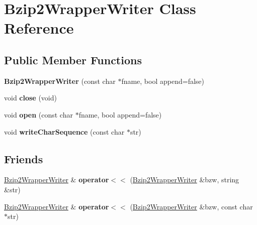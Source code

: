 \hypertarget{classBzip2WrapperWriter}{\section{Bzip2\-Wrapper\-Writer Class Reference}
\label{classBzip2WrapperWriter}
}
\subsection*{Public Member Functions}
\begin{DoxyCompactItemize}
\item 
\hypertarget{classBzip2WrapperWriter_ad4225a609f503e2a7b55dcb2c4391a46}{{\bfseries Bzip2\-Wrapper\-Writer} (const char $\ast$fname, bool append=false)}\label{classBzip2WrapperWriter_ad4225a609f503e2a7b55dcb2c4391a46}

\item 
\hypertarget{classBzip2WrapperWriter_a2e59151018a456acf11c20c063703b29}{void {\bfseries close} (void)}\label{classBzip2WrapperWriter_a2e59151018a456acf11c20c063703b29}

\item 
\hypertarget{classBzip2WrapperWriter_a64f1200fffa68a62285e1c3d07d76900}{void {\bfseries open} (const char $\ast$fname, bool append=false)}\label{classBzip2WrapperWriter_a64f1200fffa68a62285e1c3d07d76900}

\item 
\hypertarget{classBzip2WrapperWriter_a9b45f1bd540d091f27534680b84b385f}{void {\bfseries write\-Char\-Sequence} (const char $\ast$str)}\label{classBzip2WrapperWriter_a9b45f1bd540d091f27534680b84b385f}

\end{DoxyCompactItemize}
\subsection*{Friends}
\begin{DoxyCompactItemize}
\item 
\hypertarget{classBzip2WrapperWriter_ad2a13f9473d7ef7416c978ca6982b569}{\hyperlink{classBzip2WrapperWriter}{Bzip2\-Wrapper\-Writer} \& {\bfseries operator$<$$<$} (\hyperlink{classBzip2WrapperWriter}{Bzip2\-Wrapper\-Writer} \&bzw, string \&str)}\label{classBzip2WrapperWriter_ad2a13f9473d7ef7416c978ca6982b569}

\item 
\hypertarget{classBzip2WrapperWriter_af304aa377897c3a1f52bd96cd805e83a}{\hyperlink{classBzip2WrapperWriter}{Bzip2\-Wrapper\-Writer} \& {\bfseries operator$<$$<$} (\hyperlink{classBzip2WrapperWriter}{Bzip2\-Wrapper\-Writer} \&bzw, const char $\ast$str)}\label{classBzip2WrapperWriter_af304aa377897c3a1f52bd96cd805e83a}

\end{DoxyCompactItemize}


